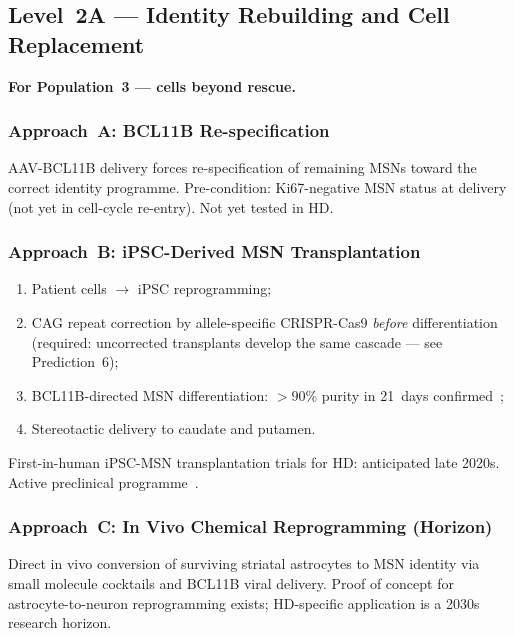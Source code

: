 \documentclass[12pt,a4paper]{article}
\begin{document}
\subsection{Level~2A --- Identity Rebuilding and
Cell Replacement}

\textbf{For Population~3 --- cells beyond rescue.}

\subsubsection{Approach~A: BCL11B Re-specification}

AAV-BCL11B delivery forces re-specification of remaining
MSNs toward the correct identity programme. Pre-condition:
Ki67-negative MSN status at delivery (not yet in
cell-cycle re-entry). Not yet tested in HD.

\subsubsection{Approach~B: iPSC-Derived MSN
Transplantation}

\begin{enumerate}[label=\arabic*.]
  \item Patient cells $\to$ iPSC reprogramming;
  \item CAG repeat correction by allele-specific
    CRISPR-Cas9 \emph{before} differentiation (required:
    uncorrected transplants develop the same cascade ---
    see Prediction~6);
  \item BCL11B-directed MSN differentiation: ${>}90\%$
    purity in 21~days confirmed~\cite{iPSC_MSN_2024};
  \item Stereotactic delivery to caudate and putamen.
\end{enumerate}

First-in-human iPSC-MSN transplantation trials for HD:
anticipated late 2020s. Active preclinical
programme~\cite{iPSC_MSN_2024}.

\subsubsection{Approach~C: In Vivo Chemical Reprogramming
(Horizon)}

Direct in vivo conversion of surviving striatal astrocytes
to MSN identity via small molecule cocktails and BCL11B
viral delivery. Proof of concept for
astrocyte-to-neuron reprogramming exists; HD-specific
application is a 2030s research horizon.

\end{document}
